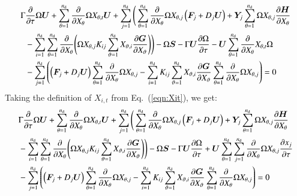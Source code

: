 \documentclass{warpdoc}
\newcommand{\alb}{\vspace{0.2cm}\\} %
\newcommand{\nd}{{{n}_{\rm d}}}
\newcommand{\mfd}{\displaystyle}
\renewcommand{\vec}[1]{\bm{#1}}
\begin{document}
\begin{align}
    \mfd\Gamma &\frac{\partial }{\partial \tau} \Omega\vec{U}
    + \sum_{\theta=1}^\nd  \frac{\partial }{\partial X_\theta} \Omega X_{\theta,t} \vec{U}
    + \sum_{j=1}^\nd \Bigg( \sum_{\theta=1}^\nd \frac{\partial}{\partial X_\theta} \Omega X_{\theta,j} \left(\vec{F}_j+D_j \vec{U}\right)+\vec{Y}_j  \sum_{\theta=1}^\nd \Omega X_{\theta,j}\frac{\partial \vec{H}}{\partial X_\theta}
     \nonumber\alb
    &- \sum_{i=1}^\nd \sum_{\theta=1}^\nd   \frac{\partial}{\partial X_\theta}
       \Bigg( \Omega X_{\theta,j} K_{ij} \sum_{\vartheta=1}^\nd X_{\vartheta,i}\frac{\partial \vec{G}}{\partial X_\vartheta} \Bigg)\Bigg)
    - \Omega\vec{S} 
    -\Gamma \vec{U} \frac{\partial \Omega}{\partial \tau}  
    - \vec{U} \sum_{\theta=1}^\nd  \frac{\partial }{\partial X_\theta} X_{\theta,t}\Omega \nonumber\alb
    &- \sum_{j=1}^\nd \left( \left(\vec{F}_j+D_j\vec{U}\right) \sum_{\theta=1}^\nd \frac{\partial}{\partial X_\theta} \Omega X_{\theta,j}
    - \sum_{i=1}^\nd K_{ij} \sum_{\vartheta=1}^\nd X_{\vartheta,i}\frac{\partial \vec{G}}{\partial X_\vartheta} \sum_{\theta=1}^\nd   \frac{\partial}{\partial X_\theta}
        \Omega X_{\theta,j}   \right)
    =0
 \label{eqn:goveq4}
\end{align}
%
Taking the definition of $X_{i,t}$ from Eq.\  (\ref{eqn:Xit}),
we get:
%
\begin{align}
    \mfd&\Gamma \frac{\partial }{\partial \tau} \Omega\vec{U}
     + \sum_{\theta=1}^\nd  \frac{\partial }{\partial X_\theta} \Omega X_{\theta,t} \vec{U}
    + \sum_{j=1}^\nd \Bigg( \sum_{\theta=1}^\nd \frac{\partial}{\partial X_\theta} \Omega X_{\theta,j} \left(\vec{F}_j+D_j \vec{U}\right)+\vec{Y}_j  \sum_{\theta=1}^\nd \Omega X_{\theta,j}\frac{\partial \vec{H}}{\partial X_\theta}
     \nonumber\alb
    &- \sum_{i=1}^\nd \sum_{\theta=1}^\nd   \frac{\partial}{\partial X_\theta}
       \Bigg( \Omega X_{\theta,j} K_{ij} \sum_{\vartheta=1}^\nd X_{\vartheta,i}\frac{\partial \vec{G}}{\partial X_\vartheta} \Bigg)\Bigg)
    - \Omega\vec{S} 
    -\Gamma \vec{U} \frac{\partial \Omega}{\partial \tau}  
    + \vec{U} \sum_{\theta=1}^\nd \sum_{j=1}^\nd \frac{\partial }{\partial X_\theta} \Omega X_{\theta,j}\frac{\partial x_j}{\partial \tau} \nonumber\alb
    &- \sum_{j=1}^\nd \left( \left(\vec{F}_j+D_j\vec{U}\right) \sum_{\theta=1}^\nd \frac{\partial}{\partial X_\theta} \Omega X_{\theta,j}
    - \sum_{i=1}^\nd K_{ij} \sum_{\vartheta=1}^\nd X_{\vartheta,i}\frac{\partial \vec{G}}{\partial X_\vartheta} \sum_{\theta=1}^\nd   \frac{\partial}{\partial X_\theta}
        \Omega X_{\theta,j}   \right)
    =0
 \label{eqn:goveq5}
\end{align}
\end{document}

